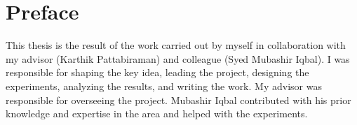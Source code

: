 
\chapter{Preface}
This thesis is the result of the work carried out by myself in collaboration with my advisor (Karthik Pattabiraman) and colleague (Syed Mubashir Iqbal). 
I was responsible for shaping the key idea, leading the project, designing the experiments, analyzing the results, and writing the work.
My advisor was responsible for overseeing the project.
Mubashir Iqbal contributed with his prior knowledge and expertise in the area and helped with the experiments.

